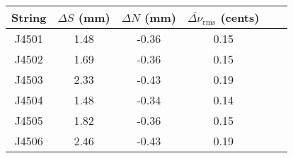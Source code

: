 \begin{tabular}{cccccc}
\toprule
String & $\Delta S$ (mm) & $\Delta N$ (mm) & $\overline{\Delta \nu}_\text{rms}$ (cents) \\
\midrule
J4501 & 1.48 & -0.36 & 0.15 \\
J4502 & 1.69 & -0.36 & 0.15 \\
J4503 & 2.33 & -0.43 & 0.19 \\
J4504 & 1.48 & -0.34 & 0.14 \\
J4505 & 1.82 & -0.36 & 0.15 \\
J4506 & 2.46 & -0.43 & 0.19 \\
\bottomrule
\end{tabular}

